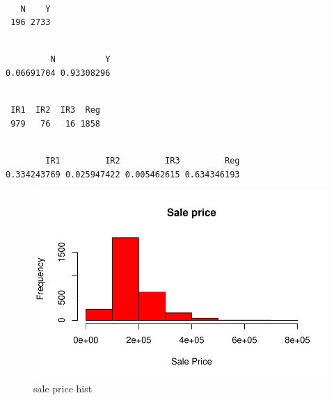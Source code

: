 \documentclass[
  letterpaper,
  DIV=11,
  numbers=noendperiod]{scrartcl}
\begin{document}
\begin{verbatim}

   N    Y 
 196 2733 
\end{verbatim}

\begin{verbatim}

         N          Y 
0.06691704 0.93308296 
\end{verbatim}

\begin{verbatim}

 IR1  IR2  IR3  Reg 
 979   76   16 1858 
\end{verbatim}

\begin{verbatim}

        IR1         IR2         IR3         Reg 
0.334243769 0.025947422 0.005462615 0.634346193 
\end{verbatim}

\begin{figure}[H]

{\centering \includegraphics{paper_files/figure-pdf/histprice-1.pdf}

}

\caption{sale price hist}

\end{figure}%
\end{document}
